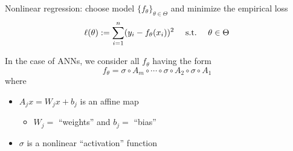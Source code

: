 \begin{frame}

    Nonlinear regression: choose model $\{f_\theta\}_{\theta \in \Theta}$ and minimize the empirical loss
    \begin{equation*}
        \ell(\theta) := \sum_{i=1}^n (y_i - f_\theta(x_i))^2
        \quad \ \mathrm{s.t.}\  \quad \theta \in \Theta
    \end{equation*}


    \pause
    \vspace{0.5em}
    In the case of ANNs, we consider all $f_\theta$ having the form
    \begin{equation*}
        f_\theta
        = \sigma \circ A_{m} 
            \circ \cdots \circ \sigma \circ A_{2}  \circ \sigma \circ A_{1}
    \end{equation*}
    where
    \begin{itemize}
        \item $A_{j} x = W_j x + b_j $ is an affine map 
        \vspace{0.5em}
        \begin{itemize}
            \item $W_j = $ ``weights'' and $b_j = $ ``bias''
        \end{itemize}
        \vspace{0.5em}
        \item $\sigma$ is a nonlinear ``activation'' function
    \end{itemize}

\end{frame}






